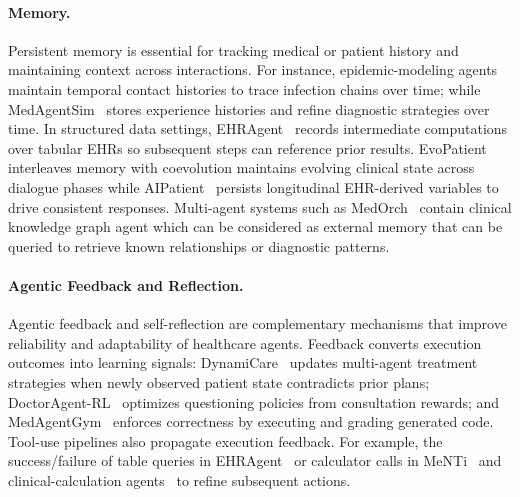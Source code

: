 \paragraph{Memory.}
Persistent memory is essential for tracking medical or patient history and maintaining context across interactions. For instance, epidemic-modeling agents~\cite{williams2023epidemicmodelinggenerativeagents} maintain temporal contact histories to trace infection chains over time; while MedAgentSim~\cite{almansoori2025selfevolvingmultiagentsimulationsrealistic} stores experience histories and refine diagnostic strategies over time. In structured data settings, EHRAgent~\cite{wenqi2024ehragent} records intermediate computations over tabular EHRs so subsequent steps can reference prior results. EvoPatient~\cite{du2025llmssimulatestandardizedpatients} interleaves memory with coevolution maintains evolving clinical state across dialogue phases while AIPatient~\cite{yu2025simulated} persists longitudinal EHR-derived variables to drive consistent responses. Multi-agent systems such as MedOrch~\cite{he2025medorchmedicaldiagnosistoolaugmented} contain clinical knowledge graph agent which can be considered as external memory that can be queried to retrieve known relationships or diagnostic patterns. 



\paragraph{Agentic Feedback and Reflection.}
Agentic feedback and self-reflection are complementary mechanisms that improve reliability and adaptability of healthcare agents. Feedback converts execution outcomes into learning signals: DynamiCare~\cite{shang2025dynamicaredynamicmultiagentframework} updates multi-agent treatment strategies when newly observed patient state contradicts prior plans; DoctorAgent-RL~\cite{feng2025doctoragentrlmultiagentcollaborativereinforcement} optimizes questioning policies from consultation rewards; and MedAgentGym~\cite{xu2025medagentgymscalableagentictraining} enforces correctness by executing and grading generated code. Tool-use pipelines also propagate execution feedback. For example, the success/failure of table queries in EHRAgent~\cite{wenqi2024ehragent} or calculator calls in MeNTi~\cite{zhu2025mentibridgingmedicalcalculator} and clinical-calculation agents~\cite{Goodell_2025} to refine subsequent actions.






